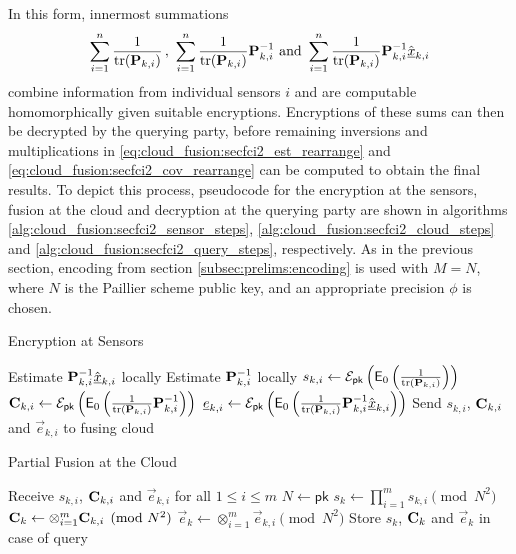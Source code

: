 In this form, innermost summations  
\begin{equation}
    \sum_{i=1}^n \frac{1}{\tr(\mat{P}_{k,i})}\,,\ \sum_{i=1}^n \frac{1}{\tr(\mat{P}_{k,i})}\mat{P}_{k,i}^{-1}\text{ and }\sum_{i=1}^n\frac{1}{\tr(\mat{P}_{k,i})}\mat{P}_{k,i}^{-1}\hat{\vec{x}}_{k,i}
\end{equation}
combine information from individual sensors $i$ and are computable homomorphically given suitable encryptions. Encryptions of these sums can then be decrypted by the querying party, before remaining inversions and multiplications in \eqref{eq:cloud_fusion:secfci2_est_rearrange} and \eqref{eq:cloud_fusion:secfci2_cov_rearrange} can be computed to obtain the final results. To depict this process, pseudocode for the encryption at the sensors, fusion at the cloud and decryption at the querying party are shown in algorithms \ref{alg:cloud_fusion:secfci2_sensor_steps}, \ref{alg:cloud_fusion:secfci2_cloud_steps} and \ref{alg:cloud_fusion:secfci2_query_steps}, respectively. As in the previous section, encoding from section \ref{subsec:prelims:encoding} is used with $M=N$, where $N$ is the Paillier scheme public key, and an appropriate precision $\phi$ is chosen.
\begin{algorithm}[htbp]
\caption{Encryption at Sensors}\label{alg:cloud_fusion:secfci2_sensor_steps}
\begin{algorithmic}[1]
    \State Estimate ${{\mathbf{P}}}_{k,i}^{-1}\hat{{\underline{x}}}_{k,i}$ locally
    \State Estimate ${{\mathbf{P}}}_{k,i}^{-1}$ locally
    \State $s_{k,i} \gets \mathcal{E}_{\mathsf{pk}}\left(\mathsf{E}_{0}\left(\frac{1}{\operatorname{tr}({{\mathbf{P}}}_{k,i})}\right)\right)$
    \State ${{\mathbf{C}}}_{k,i} \gets \mathcal{E}_{\mathsf{pk}}\left(\mathsf{E}_{0}\left(\frac{1}{\operatorname{tr}({{\mathbf{P}}}_{k,i})}{{\mathbf{P}}}_{k,i}^{-1}\right)\right)$
    \State ${\underline{e}}_{k,i} \gets \mathcal{E}_{\mathsf{pk}}\left(\mathsf{E}_{0}\left(\frac{1}{\operatorname{tr}({{\mathbf{P}}}_{k,i})}{{\mathbf{P}}}_{k,i}^{-1}\hat{{\underline{x}}}_{k,i}\right)\right)$
    \State Send $s_{k,i}$, ${{\mathbf{C}}}_{k,i}$ and $\vec{e}_{k,i}$ to fusing cloud
    \EndProcedure
\end{algorithmic}
\end{algorithm}
\begin{algorithm}[htbp]
\caption{Partial Fusion at the Cloud}\label{alg:cloud_fusion:secfci2_cloud_steps}
\begin{algorithmic}[1]
    \State Receive $s_{k,i}$, ${{\mathbf{C}}}_{k,i}$ and $\vec{e}_{k,i}$ for all $1\leq i \leq m$
    \State $N \gets \mathsf{pk}$
    \State $s_k \gets \prod_{i=1}^{m} s_{k,i} \pmod{N^2}$
    \State ${{\mathbf{C}}}_k \gets \otimes_{i=1}^{m} {{\mathbf{C}}}_{k,i} \pmod{N^2}$
    \State $\vec{e}_k \gets \otimes_{i=1}^{m} \vec{e}_{k,i} \pmod{N^2}$
    \State Store $s_k$, ${{\mathbf{C}}}_k$ and $\vec{e}_k$ in case of query
    \EndProcedure
\end{algorithmic}
\end{algorithm}
